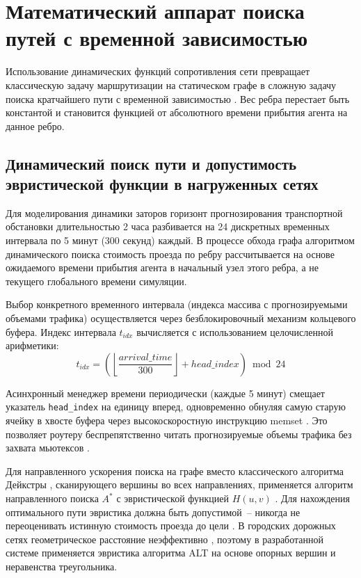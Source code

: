 \section{Математический аппарат поиска путей с временной зависимостью}\label{sec:mathematical_model}

Использование динамических функций сопротивления сети превращает классическую задачу маршрутизации на статическом графе в сложную задачу поиска кратчайшего пути с временной зависимостью \cite{utdallas_combinatorial}. Вес ребра перестает быть константой и становится функцией от абсолютного времени прибытия агента на данное ребро.

\subsection{Динамический поиск пути и допустимость эвристической функции в нагруженных сетях}

Для моделирования динамики заторов горизонт прогнозирования транспортной обстановки длительностью 2 часа разбивается на 24 дискретных временных интервала по 5 минут (300 секунд) каждый. В процессе обхода графа алгоритмом динамического поиска стоимость проезда по ребру рассчитывается на основе ожидаемого времени прибытия агента в начальный узел этого ребра, а не текущего глобального времени симуляции.

Выбор конкретного временного интервала (индекса массива с прогнозируемыми объемами трафика) осуществляется через безблокировочный механизм кольцевого буфера. Индекс интервала $t_{idx}$ вычисляется с использованием целочисленной арифметики:
\begin{equation}
    t_{idx} = \left( \left\lfloor \frac{\mathit{arrival\_time}}{300} \right\rfloor + \mathit{head\_index} \right) \bmod 24
\end{equation}

Асинхронный менеджер времени периодически (каждые 5 минут) смещает указатель \texttt{head\_index} на единицу вперед, одновременно обнуляя самую старую ячейку в хвосте буфера через высокоскоростную инструкцию memset \cite{drepper2007memory}. Это позволяет роутеру беспрепятственно читать прогнозируемые объемы трафика без захвата мьютексов \cite{butorin2026thread}.

Для направленного ускорения поиска на графе вместо классического алгоритма Дейкстры \cite{cherkassky1994shortest}, сканирующего вершины во всех направлениях, применяется алгоритм направленного поиска $A^*$ с эвристической функцией $H(u, v)$ \cite{goldberg2004alt}. Для нахождения оптимального пути эвристика должна быть допустимой~-- никогда не переоценивать истинную стоимость проезда до цели \cite{goldberg2004alt}. В городских дорожных сетях геометрическое расстояние неэффективно \cite{fuchs2010preprocessing}, поэтому в разработанной системе применяется эвристика алгоритма ALT на основе опорных вершин и неравенства треугольника.

